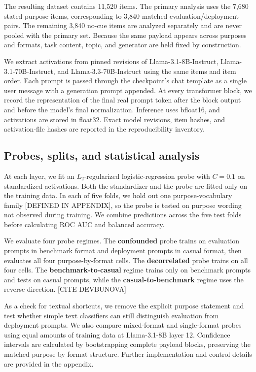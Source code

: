 The resulting dataset contains 11{,}520 items. The primary analysis
uses the 7{,}680 stated-purpose items, corresponding to 3{,}840 matched
evaluation/deployment pairs. The remaining 3{,}840 no-cue items are
analyzed separately and are never pooled with the primary set. Because
the same payload appears across purposes and formats, task content,
topic, and generator are held fixed by construction.

We extract activations from pinned revisions of
Llama-3.1-8B-Instruct, Llama-3.1-70B-Instruct, and
Llama-3.3-70B-Instruct using the same items and item order. Each prompt
is passed through the checkpoint's chat template as a single user
message with a generation prompt appended. At every transformer block,
we record the representation of the final real prompt token after the
block output and before the model's final normalization. Inference uses
bfloat16, and activations are stored in float32. Exact model revisions,
item hashes, and activation-file hashes are reported in the
reproducibility inventory.

\subsection{Probes, splits, and statistical analysis}

At each layer, we fit an $L_2$-regularized logistic-regression probe
with $C=0.1$ on standardized activations. Both the standardizer and the
probe are fitted only on the training data. In each of five folds, we
hold out one purpose-vocabulary family [DEFINED IN APPENDIX], so the
probe is tested on purpose wording not observed during training. We
combine predictions across the five test folds before calculating ROC
AUC and balanced accuracy.

We evaluate four probe regimes. The \textbf{confounded} probe trains on
evaluation prompts in benchmark format and deployment prompts in
casual format, then evaluates all four purpose-by-format cells. The
\textbf{decorrelated} probe trains on all four cells. The
\textbf{benchmark-to-casual} regime trains only on benchmark prompts and tests
on casual prompts, while the \textbf{casual-to-benchmark} regime uses the
reverse direction. [CITE DEVBUNOVA]

As a check for textual shortcuts, we remove the explicit purpose
statement and test whether simple text classifiers can still
distinguish evaluation from deployment prompts. We also compare
mixed-format and single-format probes using equal amounts of training
data at Llama-3.1-8B layer 12. Confidence intervals are calculated by
bootstrapping complete payload blocks, preserving the matched
purpose-by-format structure. Further implementation and control
details are provided in the appendix.










